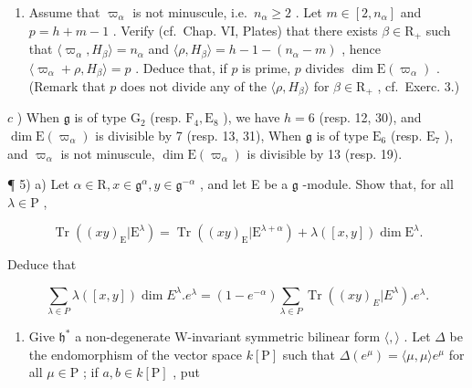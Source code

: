 \begin{enumerate}
\def\labelenumi{\alph{enumi})}
\setcounter{enumi}{1}
\tightlist
\item
  Assume that \(\varpi_{\alpha}\) is not minuscule, i.e.~\(n_{\alpha} \geq 2\) . Let \(m \in [2, n_{\alpha}]\) and \(p = h + m - 1\) . Verify (cf.~Chap. VI, Plates) that there exists \(\beta \in \mathrm{R}_{+}\) such that \(\langle \varpi_{\alpha}, H_{\beta} \rangle = n_{\alpha}\) and \(\langle \rho, H_{\beta} \rangle = h - 1 - (n_{\alpha} - m)\) , hence \(\langle \varpi_{\alpha} + \rho, H_{\beta} \rangle = p\) . Deduce that, if \(p\) is prime, \(p\) divides \(\dim \mathrm{E}(\varpi_{\alpha})\) . (Remark that \(p\) does not divide any of the \(\langle \rho, H_{\beta} \rangle\) for \(\beta \in \mathrm{R}_{+}\) , cf.~Exerc. 3.)
\end{enumerate}

\(c\) ) When \(\mathfrak{g}\) is of type \(\mathrm{G}_2\) (resp. \(\mathrm{F}_4,\mathrm{E}_8\) ), we have \(h = 6\) (resp. 12, 30), and \(\dim \mathrm{E}(\varpi_{\alpha})\) is divisible by 7 (resp. 13, 31), When \(\mathfrak{g}\) is of type \(\mathrm{E}_6\) (resp. \(\mathrm{E}_7\) ), and \(\varpi_{\alpha}\) is not minuscule, \(\dim \mathrm{E}(\varpi_{\alpha})\) is divisible by 13 (resp. 19).

¶ 5) a) Let \(\alpha \in \mathrm{R}, x \in \mathfrak{g}^{\alpha}, y \in \mathfrak{g}^{-\alpha}\) , and let E be a \(\mathfrak{g}\) -module. Show that, for all \(\lambda \in \mathrm{P}\) ,

\[
\operatorname{Tr} ((x y) _ {\mathrm{E}} | \mathrm{E} ^ {\lambda}) = \operatorname{Tr} ((x y) _ {\mathrm{E}} | \mathrm{E} ^ {\lambda + \alpha}) + \lambda ([ x, y ]) \dim \mathrm{E} ^ {\lambda}.
\]

Deduce that

\[
\sum_ {\lambda \in P} \lambda ([ x, y ]) \dim E ^ {\lambda}. e ^ {\lambda} = (1 - e ^ {- \alpha}) \sum_ {\lambda \in P} \operatorname{Tr} ((x y) _ {E} | E ^ {\lambda}). e ^ {\lambda}.
\]

\begin{enumerate}
\def\labelenumi{\alph{enumi})}
\setcounter{enumi}{1}
\tightlist
\item
  Give \(\mathfrak{h}^*\) a non-degenerate W-invariant symmetric bilinear form \(\langle ,\rangle\) . Let \(\Delta\) be the endomorphism of the vector space \(k[\mathrm{P}]\) such that \(\Delta(e^{\mu}) = \langle \mu ,\mu \rangle e^{\mu}\) for all \(\mu \in \mathrm{P}\) ; if \(a,b\in k[\mathrm{P}]\) , put
\end{enumerate}

